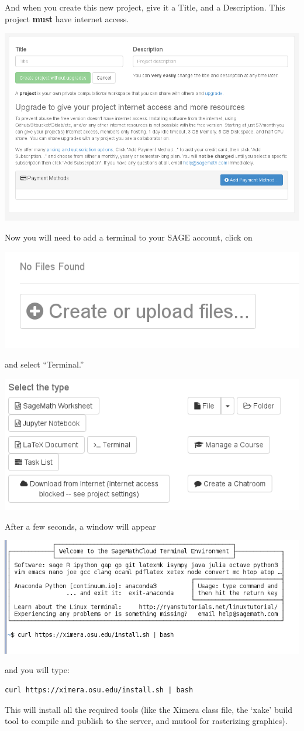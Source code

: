 \documentclass{ximera}
\begin{document}
And when you create this new project, give it a Title, and a
Description. This project \textbf{must} have internet access.
\begin{image}
  \includegraphics{internet.png}
\end{image}
Now you will need to add a terminal to your SAGE account, click on
\begin{image}
  \includegraphics{create.png}
\end{image}
and select ``Terminal.'' 
\begin{image}
  \includegraphics{type.png}
\end{image}
After a few seconds, a window will appear
\begin{image}
  \includegraphics{typingCurl.png}
\end{image}
and you will type:
\begin{verbatim}
curl https://ximera.osu.edu/install.sh | bash
\end{verbatim}
This will install all the required tools (like the Ximera class file,
the `xake' build tool to compile and publish to the server, and mutool
for rasterizing graphics).
\end{document}
